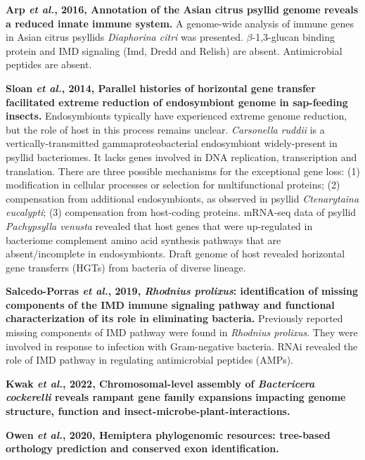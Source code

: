 \documentclass[11pt]{article}
\begin{document}
\begin{sloppypar}
\par
\textbf{Arp \textit{et al.}, 2016, Annotation of the Asian citrus psyllid genome reveals a reduced innate immune system.}
A genome-wide analysis of immune genes in Asian citrus psyllids \textit{Diaphorina citri} was presented. 
$\beta$-1,3-glucan binding protein and IMD signaling (Imd, Dredd and Relish) are absent. 
Antimicrobial peptides are absent. 
\par
\textbf{Sloan \textit{et al.}, 2014, Parallel histories of horizontal gene transfer facilitated extreme reduction of endosymbiont genome in sap-feeding insects.} \newline
Endosymbionts typically have experienced extreme genome reduction, but the role of host in this process remains unclear. 
\textit{Carsonella ruddii} is a vertically-transmitted gammaproteobacterial endosymbiont widely-present in psyllid bacteriomes. 
It lacks genes involved in DNA replication, transcription and translation. 
There are three possible mechanisms for the exceptional gene loss: 
(1) modification in cellular processes or selection for multifunctional proteins; 
(2) compensation from additional endosymbionts, as observed in psyllid \textit{Ctenarytaina eucalypti}; 
(3) compensation from host-coding proteins. 
mRNA-seq data of psyllid \textit{Pachypsylla venusta} revealed that host genes that were up-regulated in bacteriome complement amino acid synthesis pathways that are absent/incomplete in endosymbionts. 
Draft genome of host revealed horizontal gene transferrs (HGTs) from bacteria of diverse lineage. 
\par
\textbf{Salcedo-Porras \textit{et al.}, 2019, \textit{Rhodnius prolixus}: identification of missing components of the IMD immune signaling pathway and functional characterization of its role in eliminating bacteria.}
Previously reported missing components of IMD pathway were found in \textit{Rhodnius prolixus}. 
They were involved in response to infection with Gram-negative bacteria. 
RNAi revealed the role of IMD pathway in regulating antimicrobial peptides (AMPs). 
\par
\textbf{Kwak \textit{et al.}, 2022, Chromosomal-level assembly of \textit{Bactericera cockerelli} reveals rampant gene family expansions impacting genome structure, function and insect-microbe-plant-interactions.} \newline
\par
\textbf{Owen \textit{et al.}, 2020, Hemiptera phylogenomic resources: tree-based orthology prediction and conserved exon identification.} \newline

\end{sloppypar}
\end{document}
